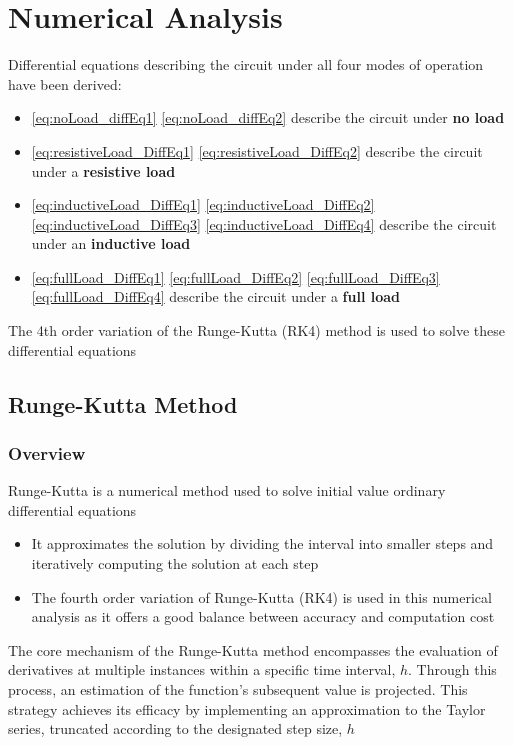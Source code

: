 \section{Numerical Analysis}
Differential equations describing the circuit under all four modes of operation have been derived:
\begin{itemize}
    \item \eqref{eq:noLoad_diffEq1} \eqref{eq:noLoad_diffEq2} describe the circuit under \textbf{no load}
    \item \eqref{eq:resistiveLoad_DiffEq1} \eqref{eq:resistiveLoad_DiffEq2}  describe the circuit under a \textbf{resistive load}
    \item \eqref{eq:inductiveLoad_DiffEq1} \eqref{eq:inductiveLoad_DiffEq2} \eqref{eq:inductiveLoad_DiffEq3} \eqref{eq:inductiveLoad_DiffEq4} describe the circuit under an \textbf{inductive load}
    \item \eqref{eq:fullLoad_DiffEq1} \eqref{eq:fullLoad_DiffEq2} \eqref{eq:fullLoad_DiffEq3} \eqref{eq:fullLoad_DiffEq4} describe the circuit under a \textbf{full load}
\end{itemize}

The 4th order variation of the Runge-Kutta (RK4) method is used to solve these differential equations

\subsection{Runge-Kutta Method}
\subsubsection{Overview}
Runge-Kutta is a numerical method used to solve initial value ordinary differential equations
\begin{itemize}
    \item It approximates the solution by dividing the interval into smaller steps and iteratively computing the solution at each step \citep{rungeKutta}
    \item The fourth order variation of Runge-Kutta (RK4) is used in this numerical analysis as it offers a good balance between accuracy and computation cost
\end{itemize}

The core mechanism of the Runge-Kutta method encompasses the evaluation of derivatives at multiple instances within a specific time interval, $h$. Through this process, an estimation of the function's subsequent value is projected. This strategy achieves its efficacy by implementing an approximation to the Taylor series, truncated according to the designated step size, $h$ \citep{rungeKutta}
\leavevmode\newline

